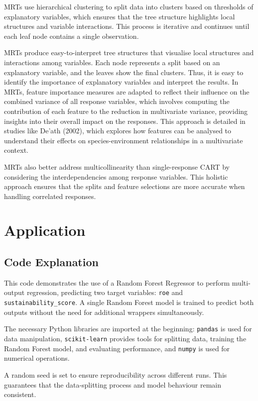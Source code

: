 MRTs use hierarchical clustering to split data into clusters based on thresholds of explanatory variables, which ensures that the tree structure highlights local structures and variable interactions.\cite{qcbs_workshop} This process is iterative and continues until each leaf node contains a single observation.

MRTs produce easy-to-interpret tree structures that visualise local structures and interactions among variables. Each node represents a split based on an explanatory variable, and the leaves show the final clusters. Thus, it is easy to identify the importance of explanatory variables and interpret the results. In MRTs, feature importance measures are adapted to reflect their influence on the combined variance of all response variables, which involves computing the contribution of each feature to the reduction in multivariate variance, providing insights into their overall impact on the responses. This approach is detailed in studies like De'ath (2002), which explores how features can be analysed to understand their effects on species-environment relationships in a multivariate context.\cite{death2002multivariate}

MRTs also better address multicollinearity than single-response CART by considering the interdependencies among response variables. This holistic approach ensures that the splits and feature selections are more accurate when handling correlated responses. 


\section{Application}
\subsection{Code Explanation}
This code demonstrates the use of a Random Forest Regressor to perform multi-output regression, predicting two target variables: \texttt{roe} and \texttt{sustainability\_score}. A single Random Forest model is trained to predict both outputs without the need for additional wrappers simultaneously.

The necessary Python libraries are imported at the beginning:
\texttt{pandas} is used for data manipulation, \texttt{scikit-learn} provides tools for splitting data, training the Random Forest model, and evaluating performance, and \texttt{numpy} is used for numerical operations.

A random seed is set to ensure reproducibility across different runs. This guarantees that the data-splitting process and model behaviour remain consistent.

